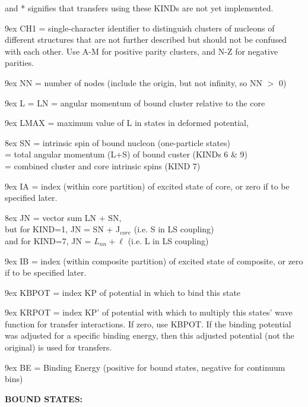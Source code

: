\documentclass[11pt]{article}
\begin{document}
and  *  signifies that transfers using these KINDs are not yet implemented.
\bigskip


\hangindent 9ex
CH1 = single-character identifier to distinguish clusters of
nucleons of different structures that are not further described
but should not be confused with each other.
Use A-M for positive parity clusters, and N-Z for negative parities.

\hangindent 9ex
NN = number of nodes (include the origin, but not infinity, so NN $>$ 0)

\hangindent 9ex
L  = LN = angular momentum of bound cluster relative to the core

\hangindent 9ex
LMAX = maximum value of L in states in deformed potential,

\hangindent 8ex  SN
      = intrinsic spin of bound nucleon (one-particle states)
\\  = total angular momentum (L+S) of bound custer (KINDs 6 \& 9)
\\  = combined cluster and core intrinsic spins     (KIND 7)



\hangindent 9ex
IA = index (within core partition) of excited state of core,
or zero if to be specified later.

\hangindent 8ex  JN
     = vector sum LN + SN,
\\   but for KIND=1, JN = SN + J$_{core}$  (i.e. S in LS coupling)
\\    and for KIND=7, JN = $L_{nn} + \ell$     (i.e. L in LS coupling)



\hangindent 9ex
IB = index (within composite partition) of excited state of composite,
or zero if to be specified later.

\hangindent 9ex
KBPOT = index KP of potential in which to bind this state

\hangindent 9ex
KRPOT = index KP' of potential with which to multiply this states'
wave function for transfer interactions. If zero, use KBPOT.
If the binding potential was adjusted for a specific binding
energy, then this adjusted potential (not the original) is used
for transfers.

\hangindent 9ex
BE = Binding Energy (positive for bound states, negative for
continuum bins)

\bigskip
{\bf BOUND STATES:}
\end{document}
